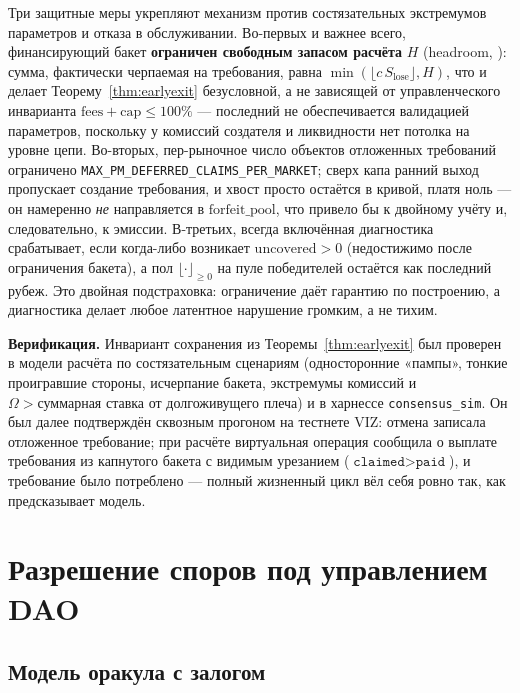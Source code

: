 \documentclass{ledger}
\theoremstyle{plain}
\theoremstyle{remark}
\begin{document}
Три защитные меры укрепляют механизм против состязательных экстремумов параметров и
отказа в обслуживании. Во-первых и важнее всего, финансирующий бакет
\textbf{ограничен свободным запасом расчёта} $H$ (headroom, ):
сумма, фактически черпаемая на требования, равна $\min(\lfloor c\,S_{\text{lose}}\rfloor, H)$,
что и делает Теорему~\ref{thm:earlyexit} безусловной, а не зависящей от
управленческого инварианта $\text{fees} + \text{cap} \le 100\%$ --- последний не
обеспечивается валидацией параметров, поскольку у комиссий создателя и ликвидности
нет потолка на уровне цепи. Во-вторых, пер-рыночное число объектов отложенных
требований ограничено \texttt{MAX\_PM\_DEFERRED\_CLAIMS\_PER\_MARKET}; сверх капа
ранний выход пропускает создание требования, и хвост просто остаётся в кривой, платя
ноль --- он намеренно \emph{не} направляется в $\text{forfeit\_pool}$, что привело бы
к двойному учёту и, следовательно, к эмиссии. В-третьих, всегда включённая
диагностика срабатывает, если когда-либо возникает $\text{uncovered} > 0$
(недостижимо после ограничения бакета), а пол $\lfloor \cdot \rfloor_{\ge 0}$ на пуле
победителей остаётся как последний рубеж. Это двойная подстраховка: ограничение даёт
гарантию по построению, а диагностика делает любое латентное нарушение громким, а не
тихим.

\textbf{Верификация.} Инвариант сохранения из Теоремы~\ref{thm:earlyexit} был
проверен в модели расчёта по состязательным сценариям (односторонние «пампы», тонкие
проигравшие стороны, исчерпание бакета, экстремумы комиссий и
$\Omega > \text{суммарная ставка}$ от долгоживущего плеча) и в харнессе
\texttt{consensus\_sim}. Он был далее подтверждён сквозным прогоном на тестнете VIZ:
отмена записала отложенное требование; при расчёте виртуальная операция сообщила о
выплате требования из капнутого бакета с видимым урезанием
($\texttt{claimed} > \texttt{paid}$), и требование было потреблено --- полный
жизненный цикл вёл себя ровно так, как предсказывает модель.

\section{Разрешение споров под управлением DAO}\label{sec:dispute}

\subsection{Модель оракула с залогом}
\end{document}
